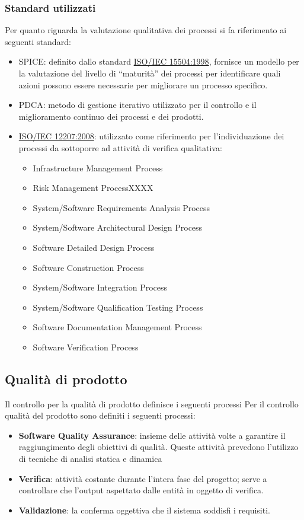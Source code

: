 \documentclass[a4paper,11pt]{article}
\begin{document}
\subsubsection{Standard utilizzati}
Per quanto riguarda la valutazione qualitativa dei processi si fa riferimento ai seguenti standard: 
\begin{itemize}
\item SPICE\addglos : definito dallo standard \underline{ISO/IEC 15504:1998}, fornisce un modello per la valutazione del livello di “maturità”
dei processi per identificare quali azioni possono essere necessarie per migliorare un processo specifico.
\item PDCA\addglos : metodo di gestione iterativo utilizzato per il controllo e il miglioramento continuo dei processi e dei prodotti.
\item \underline{ISO/IEC 12207:2008}: utilizzato come riferimento per l'individuazione dei processi da sottoporre ad attività di verifica qualitativa:
\begin{itemize}
\item Infrastructure Management Process
\item Risk Management ProcessXXXX
\item System/Software Requirements Analysis Process
\item System/Software Architectural Design Process
\item Software Detailed Design Process
\item Software Construction Process
\item System/Software Integration Process
\item System/Software Qualification Testing Process
\item Software Documentation Management Process
\item Software Verification Process

\end{itemize} 
\end{itemize}


\subsection{Qualità di prodotto}
Il controllo per la qualità di prodotto definisce i seguenti processi
Per il controllo qualità del prodotto sono definiti i seguenti processi:
\begin{itemize}
\item \textbf{Software Quality Assurance}: insieme delle attività volte a garantire il raggiungimento degli obiettivi di qualità. Queste attività prevedono l'utilizzo di tecniche di analisi statica e dinamica
\item \textbf{Verifica}: attività costante durante l'intera fase del progetto; serve a controllare che l'output aspettato dalle entità in oggetto di verifica.
\item \textbf{Validazione}: la conferma oggettiva che il sistema soddisfi i requisiti. 
\end{itemize}
\end{document}
